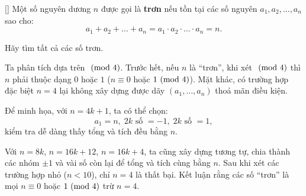 \documentclass[../02-modular-arithmetic-b.tex]{subfiles}
\begin{document}
\begin{example*}\label{example:GER-2015-MO-P2}[\textbf{}]
    Một số nguyên dương \( n \) được gọi là \textbf{trơn} nếu tồn tại các số nguyên \( a_1, a_2, \dots, a_n \) sao cho:
    \[
        a_1 + a_2 + \dots + a_n = a_1 \cdot a_2 \cdot \dots \cdot a_n = n.
    \]
    
    Hãy tìm tất cả các số trơn.
\end{example*}

\begin{story*}
    Ta phân tích dựa trên \(\ (\mathrm{mod}\ 4)\). Trước hết, nếu \(n\) là “trơn”, khi xét \(\ (\mathrm{mod}\ 4)\) thì \(n\) phải thuộc dạng \(0\) hoặc \(1\) (\(n \equiv 0\) hoặc \(1 \ (\mathrm{mod}\ 4)\)).
    Mặt khác, có trường hợp đặc biệt \(n=4\) lại không xây dựng được dãy \((a_1,\dots,a_n)\) thoả mãn điều kiện.

    Để minh họa, với \(n = 4k + 1\), ta có thể chọn:
    \[
        a_1 = n,\; 2k\text{ số } = -1,\; 2k\text{ số } = 1,
    \]
    kiểm tra dễ dàng thấy tổng và tích đều bằng \(n\).

    Với \(n = 8k\), \(n = 16k + 12\), \(n = 16k + 4\), ta cũng xây dựng tương tự, chia thành các nhóm \(\pm 1\) và vài số còn lại để tổng và tích cùng bằng \(n\).
    Sau khi xét các trường hợp nhỏ (\(n < 10\)), chỉ \(n=4\) là thất bại. Kết luận rằng các số “trơn” là mọi \(n \equiv 0\) hoặc \(1 \ (\mathrm{mod}\ 4)\) trừ \(n=4\).
\end{story*}
\end{document}
